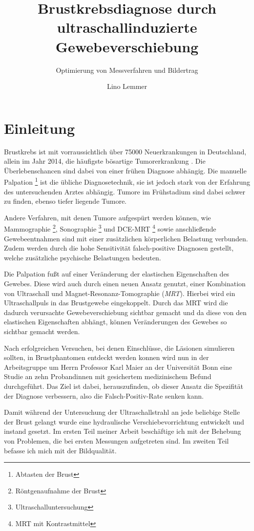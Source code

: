 \documentclass[
    11pt,
    ngerman
]{scrreprt}
\author{Lino Lemmer}
\title{Brustkrebsdiagnose durch ultraschallinduzierte Gewebeverschiebung}
\subtitle{Optimierung von Messverfahren und Bildertrag}
\begin{document}
\maketitle


\tableofcontents

\chapter{Einleitung}

Brustkrebs ist mit vorraussichtlich über 75000 Neuerkrankungen in Deutschland,
allein im Jahr 2014, die häufigste bösartige Tumorerkrankung
\parencite[68]{krebs_in_deutschland}. Die Überlebenschancen sind dabei von
einer frühen Diagnose abhängig. Die manuelle Palpation \footnote{Abtasten der
Brust} ist die übliche Diagnosetechnik, sie ist jedoch stark von der Erfahrung
des untersuchenden Arztes abhängig. Tumore im Frühstadium sind dabei schwer zu
finden, ebenso tiefer liegende Tumore.

Andere Verfahren, mit denen Tumore aufgespürt werden können, wie Mammographie
\footnote{Röntgenaufnahme der Brust}, Sonographie
\footnote{Ultraschalluntersuchung} und DCE-MRT \footnote{MRT mit
Kontrastmittel} sowie anschließende Gewebeentnahmen sind mit einer zusätzlichen
körperlichen Belastung verbunden. Zudem werden durch die hohe Sensitivität
falsch-positive Diagnosen gestellt, welche zusätzliche psychische Belastungen
bedeuten.

Die Palpation fußt auf einer Veränderung der elastischen Eigenschaften des
Gewebes.
Diese wird auch durch einen neuen Ansatz genutzt, einer Kombination
von Ultraschall und Magnet-Resonanz-Tomographie (\emph{MRT}). Hierbei wird ein
Ultraschallpuls in das Brustgewebe eingekoppelt. Durch das MRT wird die dadurch
verursachte Gewebeverschiebung sichtbar gemacht und da diese von den
elastischen Eigenschaften abhängt, können Veränderungen des Gewebes so sichtbar
gemacht werden.

Nach erfolgreichen Versuchen, bei denen Einschlüsse, die Läsionen simulieren
sollten, in Brustphantomen entdeckt werden konnen \parencite{dipl_ulucay} wird
nun in der Arbeitsgruppe um Herrn Professor Karl Maier an der Universität Bonn
eine Studie an zehn Probandinnen mit gesichertem medizinischem Befund
durchgeführt. Das Ziel ist dabei, herauszufinden, ob dieser Ansatz die
Spezifität der Diagnose verbessern, also die Falsch-Positiv-Rate senken kann.

Damit während der Untersuchung der Ultraschallstrahl an jede beliebige Stelle
der Brust gelangt wurde eine hydraulische Verschiebevorrichtung entwickelt und
instand gesetzt. Im ersten Teil meiner Arbeit beschäftige ich mit der Behebung
von Problemen, die bei ersten Messungen aufgetreten sind. Im zweiten Teil
befasse ich mich mit der Bildqualität.
\end{document}
